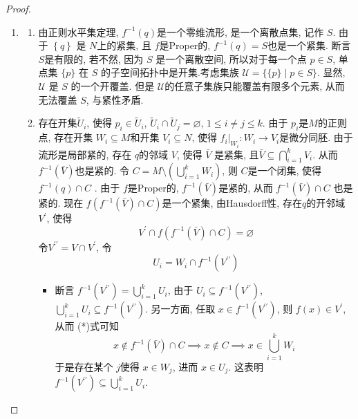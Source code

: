 \documentclass[../main.tex]{subfiles}
\begin{document}
\begin{proof}
\begin{enumerate}
    \item[b).] \begin{enumerate}
        \item[1).] 由正则水平集定理,  \(  f^{-1} \left( q \right)   \)是一个零维流形, 是一个离散点集, 记作 \(  S  \). 由于 \(  \left\{ q \right\}  \) 是 \(  N  \)上的紧集, 且 \(  f  \)是Proper的,  \(  f^{-1} \left( q \right)= S   \)也是一个紧集.    断言 \(  S  \)是有限的, 若不然,  因为 $S$ 是一个离散空间, 所以对于每一个点 $p \in S$, 单点集 $\{p\}$ 在 $S$ 的子空间拓扑中是开集.考虑集族 $\mathcal{U} = \{\{p\} \mid p \in S\}$. 显然, $\mathcal{U}$ 是 $S$ 的一个开覆盖. 但是 \(  \mathcal{U}  \)的任意子集族只能覆盖有限多个元素, 从而无法覆盖 \(  S  \), 与紧性矛盾.  
        \item[2). 3).] 存在开集\(  \tilde{U}_{i}  \),   使得 \(  p_{i}\in \tilde{U}_{i}  \), \(  \tilde{U}_{i}\cap \tilde{U}_{j}= \varnothing  \), \(  1\le i\neq j\le k  \). 由于 \(  p_{i}  \)是\(  M  \)的正则点, 存在开集 \(  W_{i}\subseteq M  \)和开集 \(  V_{i}\subseteq N  \), 使得 \(  f_{i}|_{W_{i}}: W_{i}\to V_{i}  \)是微分同胚.      由于流形是局部紧的,  存在 \(  q  \)的邻域 \(  V  \), 使得 \(  \bar{V}  \)  是紧集, 且\(  \bar{V}\subseteq \bigcap _{i= 1}^{k}V_{i}  \). 从而 \(  f^{-1} \left( \bar{V} \right)   \)也是紧的. 令 \(  C= M\setminus \left( \bigcup _{i= 1}^{k}W_{i} \right)   \), 则 \(  C  \)是一个闭集, 使得 \(  f^{-1} \left( q \right)\cap C   \) . 由于 \(  f  \)是Proper的, \(  f^{-1} \left( \bar{V} \right)   \)是紧的, 从而 \(  f^{-1} \left( \bar{V} \right)\cap C   \)        也是紧的. 现在 \(  f\left( f^{-1} \left( \bar{V} \right)\cap C  \right)   \)是一个紧集,  由Hausdorff性, 存在\(  q  \)的开邻域 \(  V^{\prime}   \), 使得 \[
        V^{\prime} \cap f\left( f^{-1} \left( \bar{V} \right)\cap C  \right) = \varnothing \tag{*}
        \]   令\(  V^{\prime \prime} = V\cap V^{\prime}   \), 令  \[
        U_{i}= W_{i}\cap f^{-1} \left(V^{\prime \prime} \right) 
        \]
        \begin{itemize}
            \item 断言 \(  f^{-1} \left( V^{\prime \prime}  \right)= \bigcup _{i= 1}^{k}U_{i}   \), 由于 \(  U_{i}\subseteq f^{-1} \left( V^{\prime \prime}  \right)   \), \(  \bigcup _{i= 1}^{k}U_{i}\subseteq f^{-1} \left( V^{\prime \prime}  \right)   \). 另一方面, 任取 \(  x \in f^{-1} \left( V^{\prime \prime}  \right)   \), 则 \(  f\left( x \right)\in V^{\prime}    \), 从而 (*)式可知 \[
            x\not \in f^{-1} \left( \bar{V} \right) \cap C\implies x\not \in C\implies x \in \bigcup _{i= 1}^{k}W_{i}
            \]    于是存在某个 \(  j  \)使得 \(  x \in W_{j}  \), 进而 \(  x \in U_{j}  \). 这表明 \(  f^{-1} \left( V^{\prime \prime}  \right)\subseteq \bigcup _{i= 1}^{k}U_{i}   \).

\end{itemize}
\end{enumerate}
\end{enumerate}
\end{proof}
\end{document}
